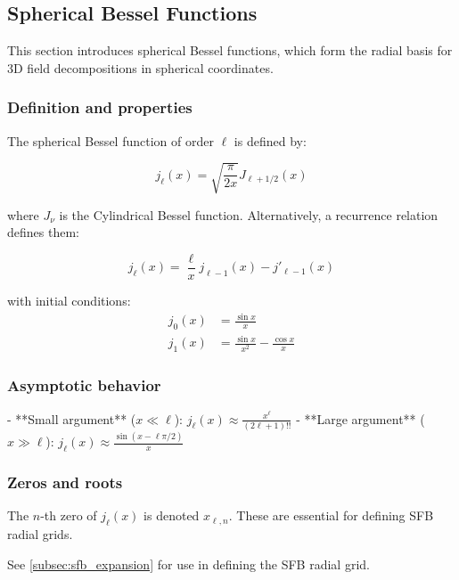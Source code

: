 \subsection{Spherical Bessel Functions}\label{subsec:sfb_bessel}

This section introduces spherical Bessel functions, which form the radial basis for 3D field decompositions in spherical coordinates.

\subsubsection{Definition and properties}

The spherical Bessel function of order $\ell$ is defined by:

\begin{equation}
j_\ell(x) = \sqrt{\frac{\pi}{2x}} J_{\ell+1/2}(x)
\end{equation}

where $J_\nu$ is the Cylindrical Bessel function. Alternatively, a recurrence relation defines them:

\begin{equation}
j_\ell(x) = \frac{\ell}{x} j_{\ell-1}(x) - j'_{\ell-1}(x)
\end{equation}

with initial conditions:
\begin{align}
j_0(x) &= \frac{\sin x}{x}\\
j_1(x) &= \frac{\sin x}{x^2} - \frac{\cos x}{x}
\end{align}

\subsubsection{Asymptotic behavior}

- **Small argument** ($x \ll \ell$): $j_\ell(x) \approx \frac{x^\ell}{(2\ell+1)!!}$
- **Large argument** ($x \gg \ell$): $j_\ell(x) \approx \frac{\sin(x - \ell\pi/2)}{x}$

\subsubsection{Zeros and roots}

The $n$-th zero of $j_\ell(x)$ is denoted $x_{\ell,n}$. These are essential for defining SFB radial grids.


See \cref{subsec:sfb_expansion} for use in defining the SFB radial grid.
